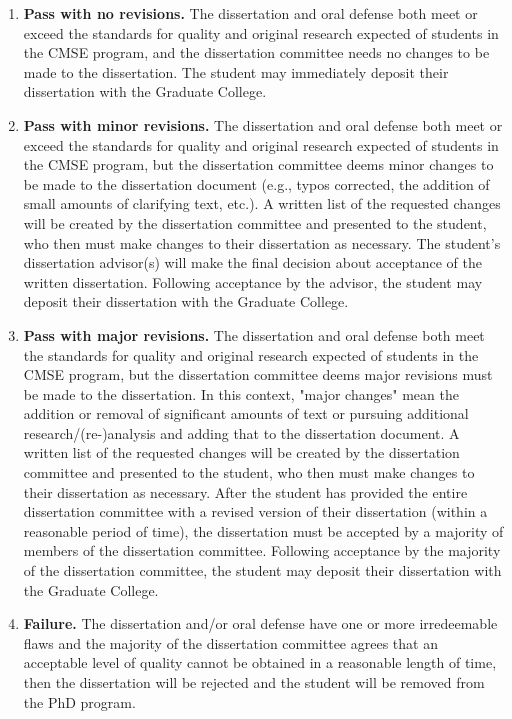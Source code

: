 \begin{enumerate}

\item \textbf{Pass with no revisions.}  The dissertation and oral
  defense both meet or exceed the standards for quality and original
  research expected of students in the CMSE program, and the dissertation
  committee needs no changes to be made to the dissertation.  The
  student may immediately deposit their dissertation with the Graduate
  College.

\item  \textbf{Pass with minor revisions.}  The dissertation and oral
  defense both meet or exceed the standards  for quality and original
  research expected of students in the CMSE program, but the dissertation
  committee deems minor changes to be made to the dissertation
  document (e.g., typos corrected, the addition of small amounts of
  clarifying text, etc.).  A written list of the requested changes
  will be created by the dissertation committee and presented to the
  student, who then must make changes to their dissertation as
  necessary.  The student's dissertation advisor(s) will make the
  final decision about acceptance of the written dissertation.
  Following acceptance by the advisor, the student may deposit their
  dissertation with the Graduate College.

\item  \textbf{Pass with major revisions.}  The dissertation and oral
  defense both meet the standards for quality and original research
  expected of students in the CMSE program, but the dissertation committee
  deems major revisions must be made to the dissertation.  In this
  context, "major changes" mean the addition or removal of significant
  amounts of text or pursuing additional research/(re-)analysis and
  adding that to the dissertation document.  A written list of the
  requested changes will be created by the dissertation committee and
  presented to the student, who then must make changes to their
  dissertation as necessary.  After the student has provided the
  entire dissertation committee with a revised version of their dissertation
  (within a reasonable period of time), the dissertation must be accepted by
  a majority of members of the dissertation committee.  Following acceptance
  by the majority of the dissertation committee, the student may deposit
  their dissertation with the Graduate College.

\item  \textbf{Failure.} The dissertation and/or oral defense have one
  or more irredeemable flaws and the majority of the dissertation committee
  agrees that an acceptable level of quality cannot be obtained in a
  reasonable length of time, then the dissertation will be rejected
  and the student will be removed from the PhD program.


\end{enumerate}

